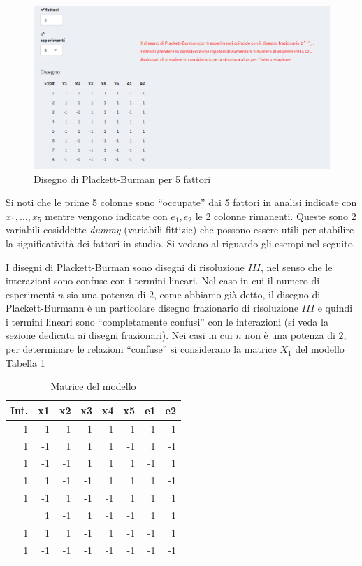 \documentclass[
  11pt,
]{book}
\begin{document}
\begin{figure}[ht]

{\centering \includegraphics[width=1\linewidth]{Immagini/PB/01_dis} 

}

\caption{Disegno di Plackett-Burman per 5 fattori}\label{fig:pb1}
\end{figure}

Si noti che le prime 5 colonne sono ``occupate'' dai 5 fattori in analisi indicate con \(x_1, \dots,x_5\) mentre vengono indicate con \(e_1,e_2\) le 2 colonne rimanenti. Queste sono 2 variabili cosiddette \emph{dummy} (variabili fittizie) che possono essere utili per stabilire la significatività dei fattori in studio. Si vedano al riguardo gli esempi nel seguito.

I disegni di Plackett-Burman sono disegni di risoluzione \(III\), nel senso che le interazioni sono confuse con i termini lineari. Nel caso in cui il numero di esperimenti \(n\) sia una potenza di \(2\), come abbiamo già detto, il disegno di Plackett-Burmann è un particolare disegno frazionario di risoluzione \(III\) e quindi i termini lineari sono ``completamente confusi'' con le interazioni (si veda la sezione dedicata ai disegni frazionari). Nei casi in cui \(n\) non è una potenza di \(2\), per determinare le relazioni ``confuse'' si considerano la matrice \(X_1\) del modello Tabella \ref{tab:matrmod}\newpage

\begin{table}

\caption{\label{tab:matrmod}Matrice del modello}
\centering
\begin{tabular}[t]{rrrrrrrr}
\toprule
Int. & x1 & x2 & x3 & x4 & x5 & e1 & e2\\
\midrule
1 & 1 & 1 & 1 & -1 & 1 & -1 & -1\\
1 & -1 & 1 & 1 & 1 & -1 & 1 & -1\\
1 & -1 & -1 & 1 & 1 & 1 & -1 & 1\\
1 & 1 & -1 & -1 & 1 & 1 & 1 & -1\\
1 & -1 & 1 & -1 & -1 & 1 & 1 & 1\\
\addlinespace
1 & 1 & -1 & 1 & -1 & -1 & 1 & 1\\
1 & 1 & 1 & -1 & 1 & -1 & -1 & 1\\
1 & -1 & -1 & -1 & -1 & -1 & -1 & -1\\
\bottomrule
\end{tabular}
\end{table}
\end{document}
